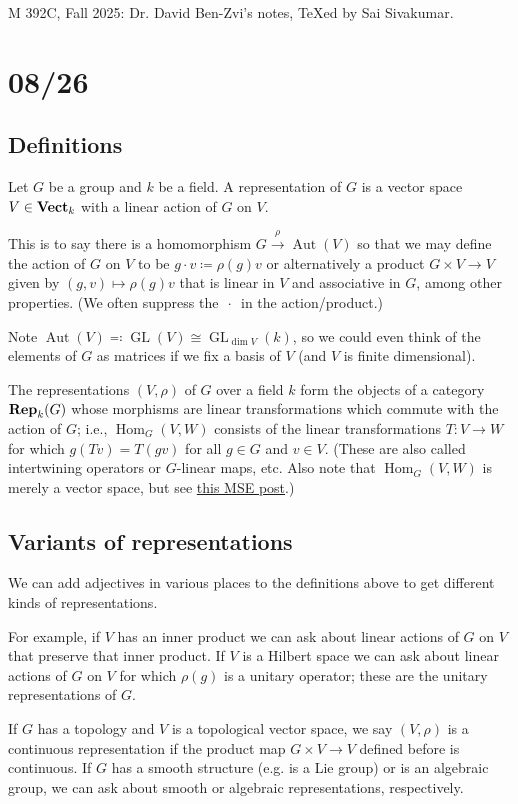 \documentclass[11pt,leqno]{article}
\theoremstyle{plain}
\theoremstyle{definition}
\numberwithin{equation}{section}
\numberwithin{lem}{section}
\DeclareMathOperator{\GL}{GL}
\DeclareMathOperator{\Hom}{Hom}
\DeclareMathOperator{\Aut}{Aut}
\newcommand{\catname}[1]{{\normalfont\mathbf{#1}}}
\newcommand{\Vect}{\catname{Vect}}
\newcommand{\Rep}{\catname{Rep}}
\begin{document}
M 392C, Fall 2025: Dr. David Ben-Zvi's notes, \TeX ed by Sai Sivakumar.
\tableofcontents

\newpage\section{08/26}
\subsection{Definitions}
Let $G$ be a group and $k$ be a field. A representation of $G$ is a vector space $V\in \Vect_k$ with a linear action of $G$ on $V$.

This is to say there is a homomorphism $G\xrightarrow{\rho}\Aut(V)$ so that we may define the action of $G$ on $V$ to be $g\cdot v \coloneqq \rho(g)v$ or alternatively a product $G\times V\to V$ given by $(g,v)\mapsto \rho(g)v$ that is linear in $V$ and associative in $G$, among other properties. (We often suppress the $\,\cdot\,$ in the action/product.)

Note $\Aut(V) \eqqcolon \GL(V) \cong \GL_{\dim V}(k)$, so we could even think of the elements of $G$ as matrices if we fix a basis of $V$ (and $V$ is finite dimensional).

The representations $(V,\rho)$ of $G$ over a field $k$ form the objects of a category $\Rep_k(G)$ whose morphisms are linear transformations which commute with the action of $G$; i.e., $\Hom_G(V,W)$ consists of the linear transformations $T\colon V\to W$ for which $g(Tv) = T(gv)$ for all $g\in G$ and $v\in V$. (These are also called intertwining operators or $G$-linear maps, etc. Also note that $\Hom_G(V,W)$ is merely a vector space, but see \href{https://math.stackexchange.com/questions/2334514/whats-the-internal-hom-of-linear-representations-of-categories}{this MSE post}.) 

\subsection{Variants of representations}
We can add adjectives in various places to the definitions above to get different kinds of representations. 

For example, if $V$ has an inner product we can ask about linear actions of $G$ on $V$ that preserve that inner product. If $V$ is a Hilbert space we can ask about linear actions of $G$ on $V$ for which $\rho(g)$ is a unitary operator; these are the unitary representations of $G$.

If $G$ has a topology and $V$ is a topological vector space, we say $(V,\rho)$ is a continuous representation if the product map $G\times V\to V$ defined before is continuous. If $G$ has a smooth structure (e.g. is a Lie group) or is an algebraic group, we can ask about smooth or algebraic representations, respectively.
\end{document}
